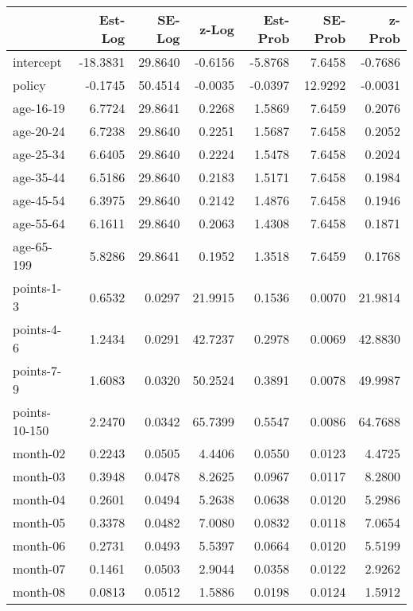 \documentclass[10pt]{article}
\begin{document}

\begin{table}[ht]
\centering
\begin{tabular}{lrrrrrr}
  \hline
 & Est-Log & SE-Log & z-Log & Est-Prob & SE-Prob & z-Prob \\ 
  \hline
intercept & -18.3831 & 29.8640 & -0.6156 & -5.8768 & 7.6458 & -0.7686 \\ 
  policy & -0.1745 & 50.4514 & -0.0035 & -0.0397 & 12.9292 & -0.0031 \\ 
  age-16-19 & 6.7724 & 29.8641 & 0.2268 & 1.5869 & 7.6459 & 0.2076 \\ 
  age-20-24 & 6.7238 & 29.8640 & 0.2251 & 1.5687 & 7.6458 & 0.2052 \\ 
  age-25-34 & 6.6405 & 29.8640 & 0.2224 & 1.5478 & 7.6458 & 0.2024 \\ 
  age-35-44 & 6.5186 & 29.8640 & 0.2183 & 1.5171 & 7.6458 & 0.1984 \\ 
  age-45-54 & 6.3975 & 29.8640 & 0.2142 & 1.4876 & 7.6458 & 0.1946 \\ 
  age-55-64 & 6.1611 & 29.8640 & 0.2063 & 1.4308 & 7.6458 & 0.1871 \\ 
  age-65-199 & 5.8286 & 29.8641 & 0.1952 & 1.3518 & 7.6459 & 0.1768 \\ 
  points-1-3 & 0.6532 & 0.0297 & 21.9915 & 0.1536 & 0.0070 & 21.9814 \\ 
  points-4-6 & 1.2434 & 0.0291 & 42.7237 & 0.2978 & 0.0069 & 42.8830 \\ 
  points-7-9 & 1.6083 & 0.0320 & 50.2524 & 0.3891 & 0.0078 & 49.9987 \\ 
  points-10-150 & 2.2470 & 0.0342 & 65.7399 & 0.5547 & 0.0086 & 64.7688 \\ 
  month-02 & 0.2243 & 0.0505 & 4.4406 & 0.0550 & 0.0123 & 4.4725 \\ 
  month-03 & 0.3948 & 0.0478 & 8.2625 & 0.0967 & 0.0117 & 8.2800 \\ 
  month-04 & 0.2601 & 0.0494 & 5.2638 & 0.0638 & 0.0120 & 5.2986 \\ 
  month-05 & 0.3378 & 0.0482 & 7.0080 & 0.0832 & 0.0118 & 7.0654 \\ 
  month-06 & 0.2731 & 0.0493 & 5.5397 & 0.0664 & 0.0120 & 5.5199 \\ 
  month-07 & 0.1461 & 0.0503 & 2.9044 & 0.0358 & 0.0122 & 2.9262 \\ 
  month-08 & 0.0813 & 0.0512 & 1.5886 & 0.0198 & 0.0124 & 1.5912 \\ 

\end{tabular}
\end{table}
\end{document}
